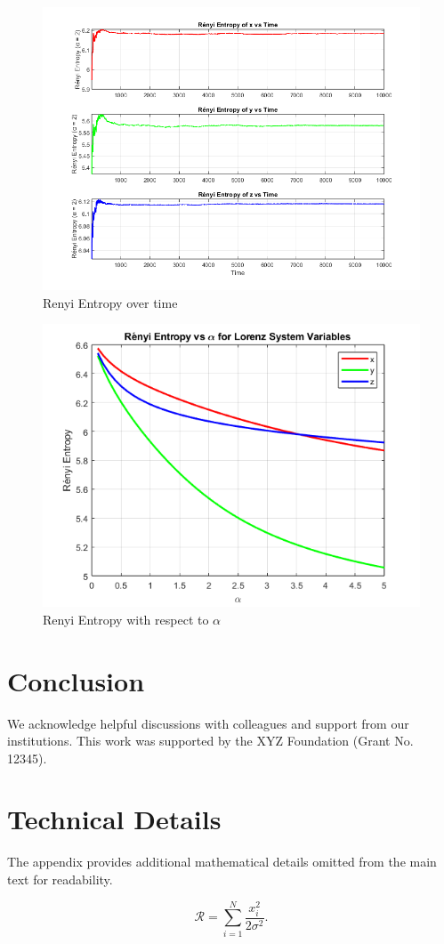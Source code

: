 \documentclass[%
reprint,
amsmath,amssymb,
aps,
floatfix,
]{revtex4-2}
\begin{document}
	\begin{figure}[htbp]
		\centering
		\includegraphics[width=0.8\linewidth]{RE_vs_time_x_y_z.png}
		\caption{Renyi Entropy over time}
		\label{fig:Renyi Entropy}
	\end{figure}
			\begin{figure}[htbp]
		\centering
		\includegraphics[width=0.8\linewidth]{renyi_entropy_vs_alpha_for_100_bin.png}
		\caption{Renyi Entropy with respect to $\alpha$}
		\label{fig:Renyi Entropy_alpha}
	\end{figure}
	\FloatBarrier

	\section{Conclusion}
	
	\begin{acknowledgments}
		We acknowledge helpful discussions with colleagues and support from our institutions. This work was supported by the XYZ Foundation (Grant No. 12345).
	\end{acknowledgments}
	
	\appendix
	\section{Technical Details}
	
	The appendix provides additional mathematical details omitted from the main text for readability.
	
	\begin{equation}
		\mathcal{R} = \sum_{i=1}^N \frac{x_i^2}{2\sigma^2}.
		\label{eq:appendix_eq}
	\end{equation}
	
	
	
\end{document}

